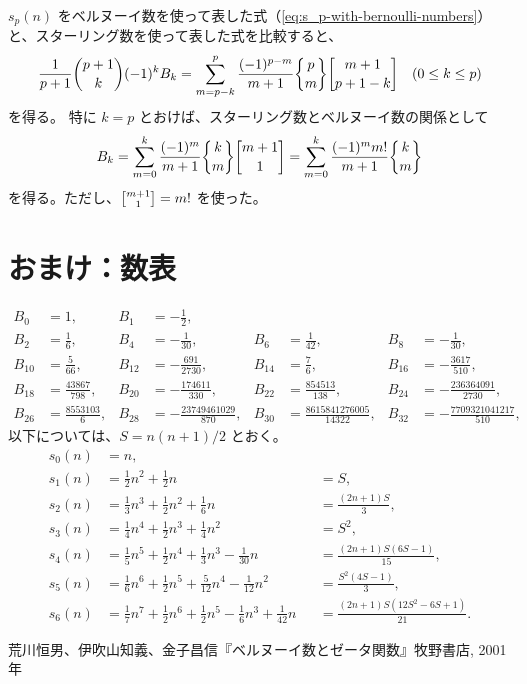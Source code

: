 {$s_p(n)$ をベルヌーイ数を使って表した式（\autoref{eq:s_p-with-bernoulli-numbers}）と、スターリング数を使って表した式を比較すると、
\[
  \frac{1}{p+1} \binom{p+1}{k} (-1)^{k} B_{k}
  =\sum_{m=p-k}^p \frac{(-1)^{p-m}}{m+1} \stirlingII{p}{m} \stirlingI{m+1}{p+1-k}
  \quad (0\le k\le p)
\]
を得る。
特に $k=p$ とおけば、スターリング数とベルヌーイ数の関係として
\begin{equation*}
  B_k
  =\sum_{m=0}^k \frac{(-1)^{m}}{m+1} \stirlingII{k}{m} \stirlingI{m+1}{1}
  =\sum_{m=0}^k \frac{(-1)^{m}m!}{m+1} \stirlingII{k}{m}
\end{equation*}
を得る。ただし、$\stirlingI{m+1}{1}=m!$ を使った。


\section{おまけ：数表}
\begin{align*}
  B_0&=1, &
  B_1&=-\frac12, \\
  B_2&=\frac16, &
  B_4&=-\frac{1}{30}, &
  B_6&=\frac{1}{42}, &
  B_8&=-\frac{1}{30}, \\
  B_{10}&=\frac{5}{66}, &
  B_{12}&=-\frac{691}{2730}, &
  B_{14}&=\frac{7}{6}, &
  B_{16}&=-\frac{3617}{510}, \\
  B_{18}&=\frac{43867}{798}, &
  B_{20}&=-\frac{174611}{330}, &
  B_{22}&=\frac{854513}{138}, &
  B_{24}&=-\frac{236364091}{2730}, \\
  B_{26}&=\frac{8553103}{6}, &
  B_{28}&=-\frac{23749461029}{870}, &
  B_{30}&=\frac{8615841276005}{14322}, &
  B_{32}&=-\frac{7709321041217}{510},
\end{align*}
以下については、$S=n(n+1)/2$ とおく。
\begin{align*}
  s_0(n)&=n, \\
  s_1(n)&=\frac12 n^2+\frac12 n &
       &=S, \\
  s_2(n)&=\frac13 n^3+\frac12 n^2+\frac16 n &
        &=\frac{(2n+1)S}{3}, \\
  s_3(n)&=\frac14 n^4+\frac12 n^3+\frac14 n^2 &
        &=S^2, \\
  s_4(n)&=\frac15 n^5+\frac12 n^4+\frac13 n^3-\frac{1}{30} n &
                                &=\frac{(2n+1)S(6S-1)}{15}, \\
  s_5(n)&=\frac16 n^6+\frac12 n^5+\frac{5}{12} n^4-\frac{1}{12} n^2 &
                                &=\frac{S^2(4S-1)}{3}, \\
  s_6(n)&=\frac17 n^7+\frac12 n^6+\frac12 n^5-\frac16 n^3+\frac{1}{42}n &
                                &=\frac{(2n+1)S(12S^2-6S+1)}{21}.
\end{align*}

\begin{thebibliography}{9}
  荒川恒男、伊吹山知義、金子昌信『ベルヌーイ数とゼータ関数』牧野書店, 2001年
\end{thebibliography}
}
